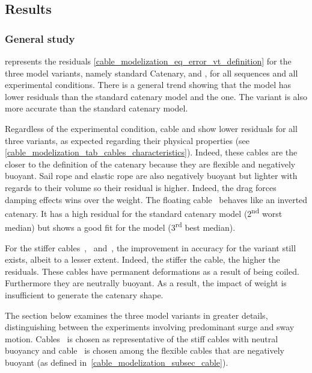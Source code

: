 \subsection{Results}

\subsubsection{General study}

 represents the residuals
\cref{cable_modelization_eq_error_vt_definition} for the three model variants, namely standard
Catenary, \gammamodel{} and \thetagammamodel{}, for all sequences and all experimental conditions.
There is a general trend showing that the \thetagammamodel{} model has lower residuals than the
standard catenary model and the \gammamodel{} one. The \gammamodel{} variant is also more accurate
than the standard catenary model.

Regardless of the experimental condition, cable  and
 show lower residuals for all three variants, as
expected regarding their physical properties (see
\cref{cable_modelization_tab_cables_characteristics}). Indeed, these cables are the closer to the
definition of the catenary because they are flexible and negatively buoyant. Sail rope
 and elastic rope
 are also negatively buoyant but lighter with regards
to their volume so their residual is higher. Indeed, the drag forces damping effects wins over the
weight. The floating cable~ behaves like an inverted
catenary. It has a high residual for the standard catenary model (2\textsuperscript{nd} worst
median) but shows a good fit for the \thetagammamodel{} model (3\textsuperscript{rd} best median).

For the stiffer
cables~,~
and~, the improvement in accuracy for the
\thetagammamodel{} variant still exists, albeit to a lesser extent. Indeed, the stiffer the cable,
the higher the residuals. These cables have permanent deformations as a result of being coiled.
Furthermore they are neutrally buoyant. As a result, the impact of weight is insufficient to
generate the catenary shape.

The section below examines the three model variants in greater details, distinguishing between the
experiments involving predominant surge and sway motion.
Cables~ is chosen as representative of the stiff
cables with neutral buoyancy and cable~ is chosen
among the flexible cables that are negatively buoyant (as defined
in~\cref{cable_modelization_subsec_cable}).

